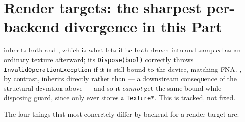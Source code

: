 \section{Render targets: the sharpest per-backend divergence in this Part}
\label{sec:rendertargets}

 inherits both  and ,
which is what lets it be both drawn into and sampled as an ordinary texture afterward; its
\texttt{Dispose(bool)} correctly throws \texttt{InvalidOperationException} if it is still
bound to the device, matching FNA. , by contrast, inherits
 directly rather than  --- a downstream
consequence of the  structural deviation above --- and so it
\emph{cannot} get the same bound-while-disposing guard, since 
only ever stores a \texttt{Texture*}. This is tracked, not fixed.

The four things that most concretely differ by backend for a render target are:

